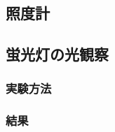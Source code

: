 \documentclass[titlepage]{jsarticle}
\begin{document}
    \subsection{照度計}

    \subsection{蛍光灯の光観察}
        \subsubsection{実験方法}

        \subsubsection{結果}
\end{document}
